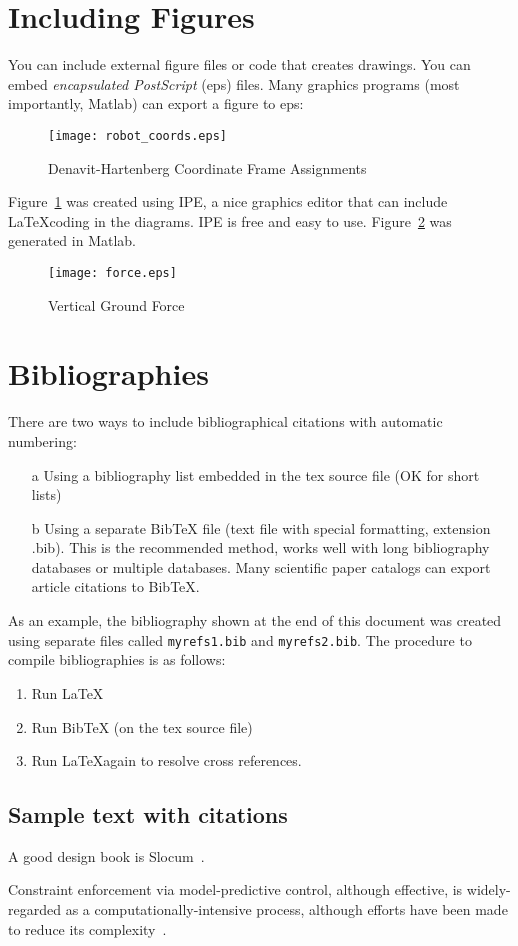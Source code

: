 \documentclass[10pt,twocolumn,letterpaper]{article} %
\begin{document}
\section{Including Figures}
You can include external figure files or code that creates drawings. You can embed \emph{encapsulated PostScript} (eps) files. Many graphics programs (most importantly, Matlab) can export a figure to eps:
\begin{figure}
\centering
\texttt{[image: robot\_coords.eps]} \caption{Denavit-Hartenberg Coordinate Frame Assignments}
\label{fig_coords} %
\end{figure}
Figure~\ref{fig_coords} was created using IPE, a nice graphics editor that can include \LaTeX coding in the diagrams. IPE is free  and easy to use. Figure~\ref{figmlab} was generated in Matlab.
\begin{figure}
\centering
\texttt{[image: force.eps]} \caption{Vertical Ground Force}
\label{figmlab}
\end{figure}
\section{Bibliographies}
There are two ways to include bibliographical citations with automatic numbering:
\begin{enumerate}
 \item [a] Using a bibliography list embedded in the tex source file (OK for short lists) %
 \item [b] Using a separate BibTeX file (text file with special formatting, extension .bib). This is the recommended method, works well with long bibliography databases or multiple databases. Many scientific paper catalogs can export article citations to BibTeX. 
\end{enumerate}
As an example, the bibliography shown at the end of this document was created using separate files called {\tt myrefs1.bib} and {\tt myrefs2.bib}. %
The procedure to compile bibliographies is as follows:
\begin{enumerate}
 \item Run \LaTeX
 \item Run BibTeX (on the tex source file)
 \item Run \LaTeX again to resolve cross references.
\end{enumerate}
\subsection{Sample text with citations}
A good design book is Slocum~\cite{slocum}.


Constraint enforcement via model-predictive control, although effective, is widely-regarded as a computationally-intensive process, although efforts have been made to reduce its  complexity~\cite{bempoTAC02,bempoaut02,AIAA-MPC}.




\end{document}
